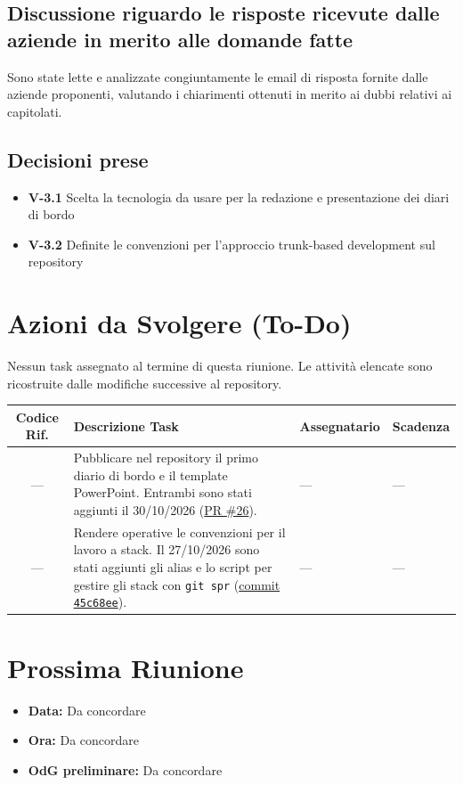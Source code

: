 \documentclass[a4paper, 11pt]{article}
\begin{document}
\subsection{Discussione riguardo le risposte ricevute dalle aziende in merito alle domande fatte}
Sono state lette e analizzate congiuntamente le email di risposta fornite dalle aziende proponenti, valutando i chiarimenti ottenuti in merito ai dubbi relativi ai capitolati.

\subsection{Decisioni prese}
\begin{itemize}
    \item \textbf{V-3.1} Scelta la tecnologia da usare per la redazione e presentazione dei diari di bordo
    \item \textbf{V-3.2} Definite le convenzioni per l'approccio trunk-based development sul repository
\end{itemize}

\vspace{0.5cm}
\section{Azioni da Svolgere (To-Do)}
Nessun task assegnato al termine di questa riunione. Le attività elencate sono ricostruite dalle modifiche successive al repository.

\begin{tabularx}{\textwidth}{|c|X|l|l|}
\hline
\textbf{Codice Rif.} & \textbf{Descrizione Task} & \textbf{Assegnatario} & \textbf{Scadenza} \\ \hline
--- & Pubblicare nel repository il primo diario di bordo e il template PowerPoint. Entrambi sono stati aggiunti il 30/10/2026 (\href{https://github.com/BitCrusher-Team/Progetto_SWE_26-27/pull/26}{PR \#26}). & --- & --- \\ \hline
--- & Rendere operative le convenzioni per il lavoro a stack. Il 27/10/2026 sono stati aggiunti gli alias e lo script per gestire gli stack con \texttt{git spr} (\href{https://github.com/BitCrusher-Team/Progetto_SWE_26-27/commit/45c68ee}{commit \texttt{45c68ee}}). & --- & --- \\ \hline
\end{tabularx}

\vspace{0.5cm}
\section{Prossima Riunione}
\begin{itemize}
    \item \textbf{Data:} Da concordare
    \item \textbf{Ora:} Da concordare
    \item \textbf{OdG preliminare:} Da concordare
\end{itemize}
\end{document}

